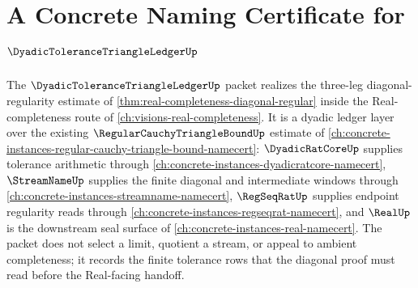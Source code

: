 \chapter{A Concrete Naming Certificate for $\DyadicToleranceTriangleLedgerUp$}
\label{ch:concrete-instances-dyadic-tolerance-triangle-ledger-namecert}

The $\DyadicToleranceTriangleLedgerUp$ packet realizes the three-leg diagonal-regularity estimate of \autoref{thm:real-completeness-diagonal-regular} inside the Real-completeness route of \autoref{ch:visions-real-completeness}. It is a dyadic ledger layer over the existing $\RegularCauchyTriangleBoundUp$ estimate of \autoref{ch:concrete-instances-regular-cauchy-triangle-bound-namecert}: $\DyadicRatCoreUp$ supplies tolerance arithmetic through \autoref{ch:concrete-instances-dyadicratcore-namecert}, $\StreamNameUp$ supplies the finite diagonal and intermediate windows through \autoref{ch:concrete-instances-streamname-namecert}, $\RegSeqRatUp$ supplies endpoint regularity reads through \autoref{ch:concrete-instances-regseqrat-namecert}, and $\RealUp$ is the downstream seal surface of \autoref{ch:concrete-instances-real-namecert}. The packet does not select a limit, quotient a stream, or appeal to ambient completeness; it records the finite tolerance rows that the diagonal proof must read before the Real-facing handoff.

